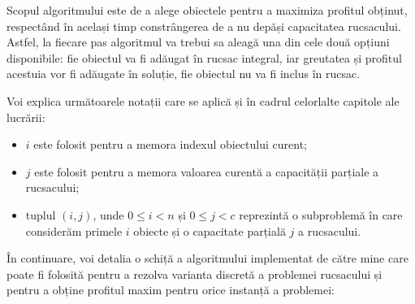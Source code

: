 \begin{sloppypar}
\renewcommand{\labelitemi}{$\rightarrow$}

Scopul algoritmului este de a alege obiectele pentru a maximiza profitul obținut, respectând în același timp constrângerea de a nu depăși capacitatea rucsacului. Astfel, la fiecare pas algoritmul va trebui sa aleagă una din cele două opțiuni disponibile: fie obiectul va fi adăugat în rucsac integral, iar greutatea și profitul acestuia vor fi adăugate în soluție, fie obiectul nu va fi inclus în rucsac. \par
Voi explica următoarele notații care se aplică și în cadrul celorlalte capitole ale lucrării:
\begin{itemize}
    \item $i$ este folosit pentru a memora indexul obiectului curent;
    \item $j$ este folosit pentru a memora valoarea curentă a capacității parțiale a rucsacului;
    \item tuplul $(i, j)$, unde $0 \le i < n$ și $0 \le j < c$ reprezintă o subproblemă în care considerăm primele $i$ obiecte și o capacitate parțială $j$ a rucsacului. 
\end{itemize}  \par

\renewcommand{\labelitemi}{$\bullet$}

În continuare, voi detalia o schiță a algoritmului implementat de către mine care poate fi folosită pentru a rezolva varianta discretă a problemei rucsacului și pentru a obține profitul maxim pentru orice instanță a problemei:


\end{sloppypar}
